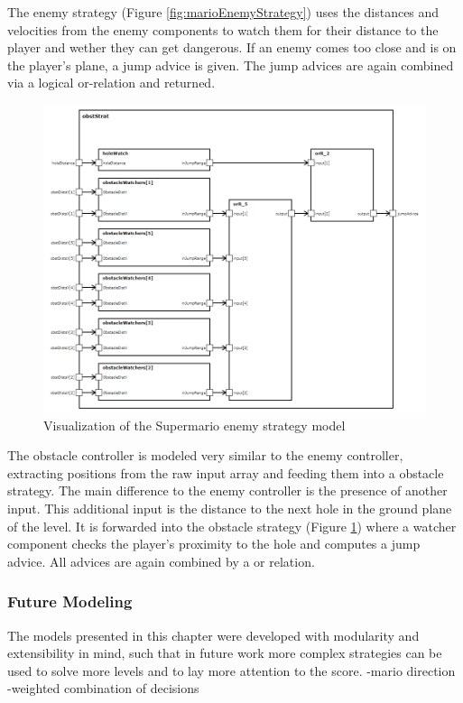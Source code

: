 The enemy strategy (Figure \ref{fig:marioEnemyStrategy}) uses the distances and velocities from the enemy components to watch them for their distance to the player and wether they can get dangerous. If an enemy comes too close and is on the player's plane, a jump advice is given. The jump advices are again combined via a logical or-relation and returned.

\begin{figure}
	\centering
	\includegraphics[scale=0.4]{pictures/haller_obstaclestrategy.PNG}
	\caption{Visualization of the Supermario enemy strategy model}
	\label{fig:marioObstacleStrategy}
\end{figure}

The obstacle controller is modeled very similar to the enemy controller, extracting positions from the raw input array and feeding them into a obstacle strategy. The main difference to the enemy controller is the presence of another input. This additional input is the distance to the next hole in the ground plane of the level. It is forwarded into the obstacle strategy (Figure \ref{fig:marioObstacleStrategy}) where a watcher component checks the player's proximity to the hole and computes a jump advice. All advices are again combined by a or relation.


\subsubsection{Future Modeling}

The models presented in this chapter were developed with modularity and extensibility in mind, such that in future work more complex strategies can be used to solve more levels and to lay more attention to the score.
-mario direction
-weighted combination of decisions